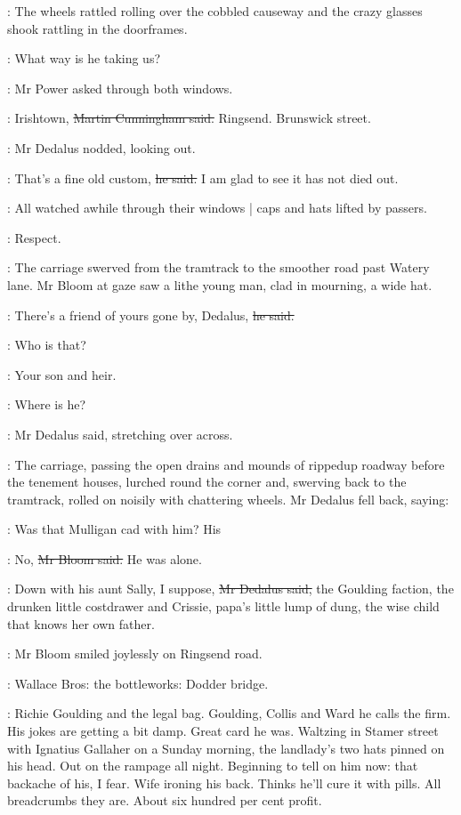 :
The wheels
rattled rolling over the cobbled causeway
and the crazy glasses shook rattling in the doorframes.

\power:
What way is he taking us?

:
Mr Power asked through both windows.

\cunningham:
Irishtown,
\sout{Martin Cunningham said.}
Ringsend.
Brunswick street.

:
Mr Dedalus nodded, looking out.

\Bloom:
That's a fine old custom,
\sout{he said.}
I am glad to see it has not died out.

:
All watched awhile through their windows |
caps and hats lifted by passers.

\BloomInt:
Respect.

:
The carriage swerved from the tramtrack to the smoother road past Watery lane.
Mr Bloom at gaze saw a lithe young man,
clad in mourning, a wide hat.

\Bloom:
There's a friend of yours gone by, Dedalus,
\sout{he said.}

\simon:
Who is that?

\Bloom:
Your son and heir.

\simon:
Where is he?

:
Mr Dedalus said,
stretching over across.

:
The carriage, passing the open drains and mounds of rippedup roadway
before the tenement houses,
lurched round the corner
and, swerving back to the tramtrack, rolled on noisily with chattering wheels.
Mr Dedalus fell back, saying:

\simon:
Was that Mulligan cad with him?
His 

\Bloom:
No,
\sout{Mr Bloom said.}
He was alone.

\simon:
Down with his aunt Sally, I suppose,
\sout{Mr Dedalus said,}
the Goulding faction,
the drunken little costdrawer
and Crissie, papa's little lump of dung,
the wise child that knows her own father.

:
Mr Bloom smiled joylessly on Ringsend road.

\BloomInt:
Wallace Bros:
the bottleworks:
Dodder bridge.

\BloomInt:
Richie Goulding and the legal bag.
Goulding, Collis and Ward he calls the firm.
His jokes are getting a bit damp.
Great card he was.
Waltzing in Stamer street with Ignatius Gallaher on a Sunday morning,
the landlady's two hats pinned on his head.
Out on the rampage all night.
Beginning to tell on him now:
that backache of his, I fear.
Wife ironing his back.
Thinks he'll cure it with pills.
All breadcrumbs they are.
About six hundred per cent profit.

